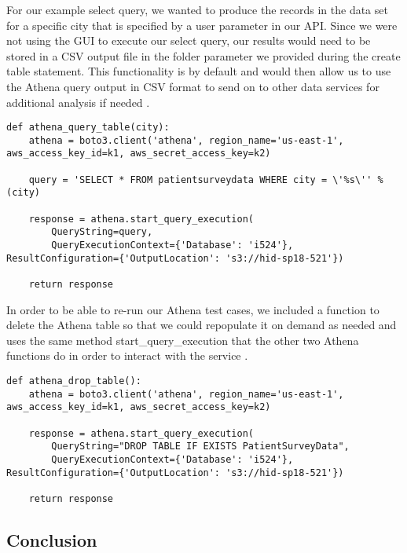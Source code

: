 For our example select query, we wanted to produce the records in the data set for a specific city that is specified by a user parameter in our API. Since we were not using the GUI to execute our select query, our results would need to be stored in a CSV output file in the folder parameter we provided during the create table statement. This functionality is by default and would then allow us to use the Athena query output in CSV format to send on to other data services for additional analysis if needed \cite{hid-sp18-521-boto-athena}.  

\begin{verbatim}
def athena_query_table(city):
    athena = boto3.client('athena', region_name='us-east-1', aws_access_key_id=k1, aws_secret_access_key=k2)

    query = 'SELECT * FROM patientsurveydata WHERE city = \'%s\'' % (city)

    response = athena.start_query_execution(
        QueryString=query,
        QueryExecutionContext={'Database': 'i524'}, ResultConfiguration={'OutputLocation': 's3://hid-sp18-521'})

    return response
\end{verbatim}

In order to be able to re-run our Athena test cases, we included a function to delete the Athena table so that we could repopulate it on demand as needed and uses the same method start_query_execution that the other two Athena functions do in order to interact with the service \cite{hid-sp18-521-boto-athena}. 

\begin{verbatim}
def athena_drop_table():
    athena = boto3.client('athena', region_name='us-east-1', aws_access_key_id=k1, aws_secret_access_key=k2)

    response = athena.start_query_execution(
        QueryString="DROP TABLE IF EXISTS PatientSurveyData",
        QueryExecutionContext={'Database': 'i524'}, ResultConfiguration={'OutputLocation': 's3://hid-sp18-521'})

    return response
\end{verbatim}

\subsection{Conclusion}

